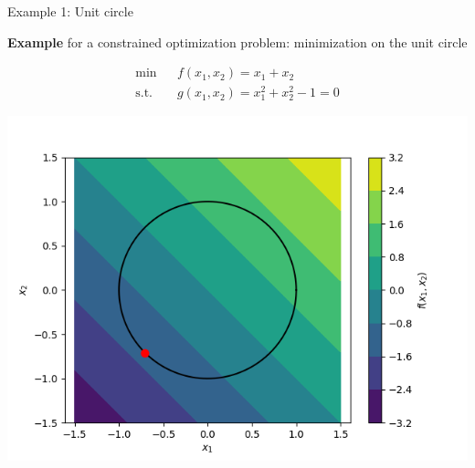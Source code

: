 \begin{vbframe}{Example 1: Unit circle}


\textbf{Example} for a constrained optimization problem: minimization on the unit circle

\begin{eqnarray*}
  \min && f(x_1, x_2) = x_1 + x_2 \\
  \text{s.t. } && g(x_1,x_2) = x_1^2 + x_2^2 - 1 = 0
\end{eqnarray*}

\begin{center}
  \includegraphics[height=0.3\textwidth, keepaspectratio]{figure_man/unit_circle.png} \\
\end{center}

\end{vbframe}

